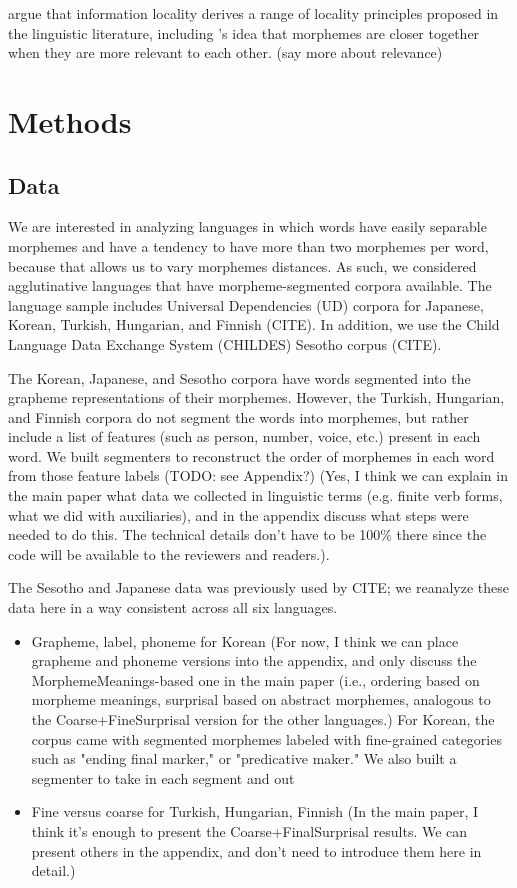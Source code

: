 \documentclass[11pt,letterpaper]{article}
\newcommand\mhahn[1]{{\color{red}(#1)}}
\newcommand\becky[1]{{\color{blue}(#1)}}
\begin{document}
\citet{Hahn2020modeling} argue that information locality derives a range of locality principles proposed in the linguistic literature, including \cite{bybee-morphology-1985}'s idea that morphemes are closer together when they are more relevant to each other.
\mhahn{say more about relevance}

\section{Methods}

\subsection{Data} %

We are interested in analyzing languages in which words have easily separable morphemes and have a tendency to have more than two morphemes per word, because that allows us to vary morphemes distances. As such, we considered agglutinative languages that have morpheme-segmented corpora available. The language sample includes Universal Dependencies (UD) corpora for Japanese, Korean, Turkish, Hungarian, and Finnish (CITE). In addition, we use the Child Language Data Exchange System (CHILDES) Sesotho corpus (CITE). 

The Korean, Japanese, and Sesotho corpora have words segmented into the grapheme representations of their morphemes. However, the Turkish, Hungarian, and Finnish corpora do not segment the words into morphemes, but rather include a list of features (such as person, number, voice, etc.) present in each word. We built segmenters to reconstruct the order of morphemes in each word from those feature labels \becky{TODO: see Appendix?} \mhahn{Yes, I think we can explain in the main paper what data we collected in linguistic terms (e.g. finite verb forms, what we did with auxiliaries), and in the appendix discuss what steps were needed to do this. The technical details don't have to be 100\% there since the code will be available to the reviewers and readers.}.

The Sesotho and Japanese data was previously used by CITE; we reanalyze these data here in a way consistent across all six languages.

\begin{itemize}
    \item Grapheme, label, phoneme for Korean \mhahn{For now, I think we can place grapheme and phoneme versions into the appendix, and only discuss the MorphemeMeanings-based one in the main paper (i.e., ordering based on morpheme meanings, surprisal based on abstract morphemes, analogous to the Coarse+FineSurprisal version for the other languages.}
    For Korean, the corpus came with segmented morphemes labeled with fine-grained categories such as "ending final marker," or "predicative maker." We also built a segmenter to take in each segment and out
    \item Fine versus coarse for Turkish, Hungarian, Finnish \mhahn{In the main paper, I think it's enough to present the Coarse+FinalSurprisal results. We can present others in the appendix, and don't need to introduce them here in detail.}
\end{itemize}
\end{document}
